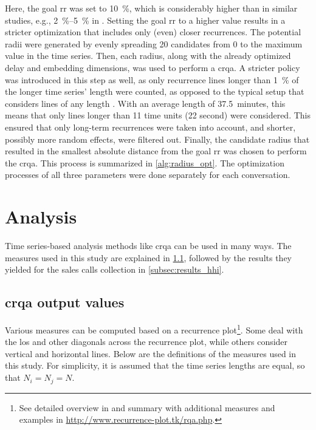 Here, the goal \ac{rr} was set to \SI{10}{\percent}, which is considerably higher than in similar studies, e.g., \SIrange{2}{5}{\percent} in \citet{Coco2014crqa-r}.
Setting the goal \ac{rr} to a higher value results in a stricter optimization that includes only (even) closer recurrences.
The potential radii were generated by evenly spreading 20 candidates from 0 to the maximum value in the time series.
Then, each radius, along with the already optimized delay and embedding dimensions, was used to perform a \ac{crqa}.
A stricter policy was introduced in this step as well, as only recurrence lines longer than \SI{1}{\percent} of the longer time series' length were counted, as opposed to the typical setup that considers lines of any length \citep[e.g., as in ][]{Borrie2019syncing}.
With an average length of \SI{37.5}{minutes}, this means that only lines longer than  11 time units (22 second) were considered.
This ensured that only long-term recurrences were taken into account, and shorter, possibly more random effects, were filtered out.
Finally, the candidate radius that resulted in the smallest absolute distance from the goal \ac{rr} was chosen to perform the \ac{crqa}.
This process is summarized in \cref{alg:radius_opt}.
The optimization processes of all three parameters were done separately for each conversation.

\section{Analysis}
\label{sec:analysis_hhi}

Time series-based analysis methods like \ac{crqa} can be used in many ways.
The measures used in this study are explained in \cref{subsec:output_values}, followed by the results they yielded for the sales calls collection in \cref{subsec:results_hhi}.

\subsection{\Acs{crqa} output values}
\label{subsec:output_values}

Various measures can be computed based on a recurrence plot\footnote{See detailed overview in \citet{Marwan2007recurrence} and summary with additional measures and examples in \url{http://www.recurrence-plot.tk/rqa.php}.}.
Some deal with the \ac{los} and other diagonals across the recurrence plot, while others consider vertical and horizontal lines.
Below are the definitions of the measures used in this study.
For simplicity, it is assumed that the time series lengths are equal, so that $N_i=N_j=N$.

